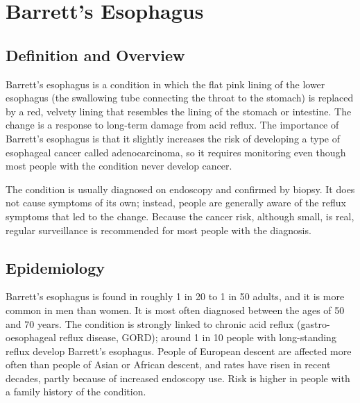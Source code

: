 \chapter{Barrett's Esophagus}

\section*{Definition and Overview}
Barrett's esophagus is a condition in which the flat pink lining of the lower esophagus (the swallowing tube connecting the throat to the stomach) is replaced by a red, velvety lining that resembles the lining of the stomach or intestine. The change is a response to long-term damage from acid reflux. The importance of Barrett's esophagus is that it slightly increases the risk of developing a type of esophageal cancer called adenocarcinoma, so it requires monitoring even though most people with the condition never develop cancer.

The condition is usually diagnosed on endoscopy and confirmed by biopsy. It does not cause symptoms of its own; instead, people are generally aware of the reflux symptoms that led to the change. Because the cancer risk, although small, is real, regular surveillance is recommended for most people with the diagnosis.

\section*{Epidemiology}
Barrett's esophagus is found in roughly 1 in 20 to 1 in 50 adults, and it is more common in men than women. It is most often diagnosed between the ages of 50 and 70 years. The condition is strongly linked to chronic acid reflux (gastro-oesophageal reflux disease, GORD); around 1 in 10 people with long-standing reflux develop Barrett's esophagus. People of European descent are affected more often than people of Asian or African descent, and rates have risen in recent decades, partly because of increased endoscopy use. Risk is higher in people with a family history of the condition.


